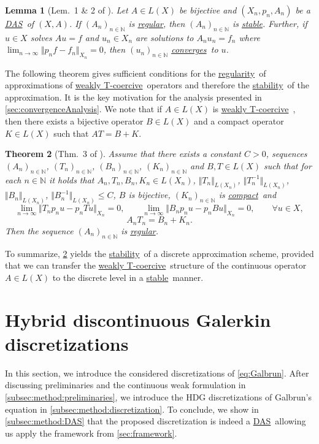 \documentclass{m2an}
\newcommand{\IN}{\mathbb{N}}
\newcommand{\seq}[1]{(#1_n)_{n \in \mathbb{N}}}
\newcommand\converges{\hyperlink{converge}{converges}}
\newcommand\stable{\hyperlink{stable}{stable}}
\newcommand\stability{\hyperlink{stable}{stability}}
\newcommand\regular{\hyperlink{regular}{regular}}
\newcommand\regularity{\hyperlink{regular}{regularity}}
\newcommand\compactop{\hyperlink{compactop}{compact}}
\newcommand{\weaklyTcoercive}{\hyperlink{weakTcoercivity}{weakly T-coercive}}
\newcommand{\DAS}{\hyperlink{DAS}{DAS}}
\theoremstyle{plain}
\newtheorem{theorem}{Theorem}%
\newtheorem{lemma}[theorem]{Lemma}
\theoremstyle{definition}
\begin{document}
\begin{lemma}[Lem.~1 \& 2 of \cite{HLS22H1}]\label{lem:RegularStable}
   Let $A \in L(X)$ be bijective and $(X_n,p_n, A_n)$ be a \DAS~of $(X,A)$. If $\seq{A}$ is \regular, then $\seq{A}$ is \stable. Further, if $u \in X$ solves $Au=f$ and $u_n \in X_n$ are solutions to $A_n u_n = f_n$ where $\lim_{n \rightarrow \infty} \Vert p_n f - f_n \Vert_{X_n} = 0$, then $\seq{u}$ \converges~to $u$.
\end{lemma}

The following theorem gives sufficient conditions for the \regularity~of approximations of \weaklyTcoercive~operators and therefore the \stability~of the approximation. It is the key motivation for the analysis presented in \cref{sec:convergenceAnalysis}. We note that if $A \in L(X)$ is \weaklyTcoercive~, then there exists a bijective operator $B \in L(X)$ and a compact operator $K \in L(X)$ such that $AT = B + K$. 

\begin{theorem}[Thm.~3 of \cite{HLS22H1}]\label{thm:weakTcompatibility}
   Assume that there exists a constant $C>0$, sequences $\seq{A}$, $\seq{T}$, $\seq{B}$, $\seq{K}$ and $B,T \in L(X)$ such that for each $n \in \IN$ it holds that $A_n,T_n,B_n,K_n \in L(X_n)$, $\Vert T_n \Vert_{L(X_n)}$, $\Vert T_n^{-1} \Vert_{L(X_n)}$, $\Vert B_n \Vert_{L(X_n)}$, $\Vert B_n^{-1} \Vert_{L(X_n)} \le C$, $B$ is bijective, $\seq{K}$ is \compactop~and 
   \begin{equation*}
      \lim_{n \rightarrow \infty} \Vert T_n p_n u - p_n T u \Vert_{X_n} = 0, \qquad \lim_{n \rightarrow \infty} \Vert B_n p_n u - p_n B u \Vert_{X_n} = 0, \qquad \forall u \in X,
   \end{equation*} 
   \begin{equation*}
      A_n T_n = B_n + K_n. 
   \end{equation*}
   Then the sequence $\seq{A}$ is \regular. 
\end{theorem}

To summarize, \cref{thm:weakTcompatibility} yields the \stability~of a discrete approximation scheme, provided that we can transfer the \weaklyTcoercive~structure of the continuous operator $A \in L(X)$ to the discrete level in a \stable~manner. 

\section{Hybrid discontinuous Galerkin discretizations}\label{sec:method}
In this section, we introduce the considered discretizations of \eqref{eq:Galbrun}. After discussing preliminaries and the continuous weak formulation in \cref{subsec:method:preliminaries}, we introduce the HDG discretizations of Galbrun's equation in \cref{subsec:method:discretization}. To conclude, we show in \cref{subsec:method:DAS} that the proposed discretization is indeed a \DAS~allowing us apply the framework from \cref{sec:framework}. 
\end{document}
